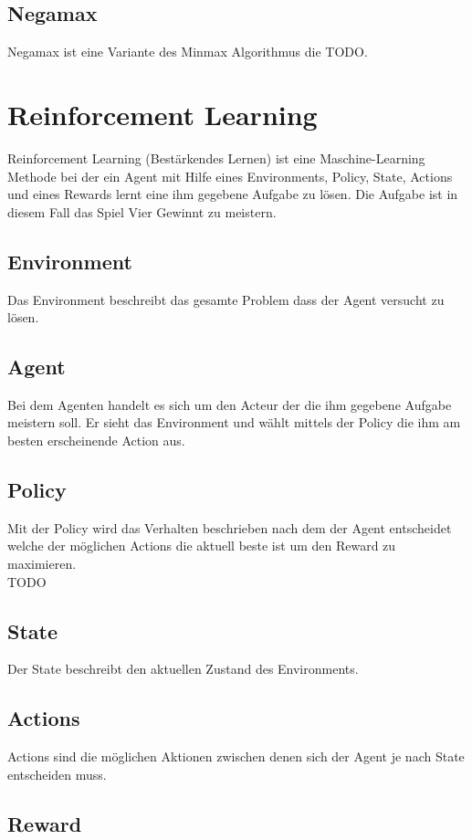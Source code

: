 \subsection{Negamax}
Negamax ist eine Variante des Minmax Algorithmus die \colorbox{red!30}{TODO}.

\section{Reinforcement Learning}
Reinforcement Learning (Bestärkendes Lernen) ist eine Maschine-Learning Methode bei der ein Agent mit Hilfe eines Environments, Policy, State, Actions und eines Rewards lernt eine ihm gegebene Aufgabe zu lösen.
Die Aufgabe ist in diesem Fall das Spiel Vier Gewinnt zu meistern.

\subsection{Environment}
Das Environment beschreibt das gesamte Problem dass der Agent versucht zu lösen.


\subsection{Agent}
Bei dem Agenten handelt es sich um den Acteur der die ihm gegebene Aufgabe meistern soll. Er sieht das Environment und wählt mittels der Policy die ihm am besten erscheinende Action aus.


\subsection{Policy}
Mit der Policy wird das Verhalten beschrieben nach dem der Agent entscheidet welche der möglichen Actions die aktuell beste ist um den Reward zu maximieren.\\
\colorbox{red!30}{TODO} %

\subsection{State}
Der State beschreibt den aktuellen Zustand des Environments.

\subsection{Actions}
Actions sind die möglichen Aktionen zwischen denen sich der Agent je nach State entscheiden muss.

\subsection{Reward}

